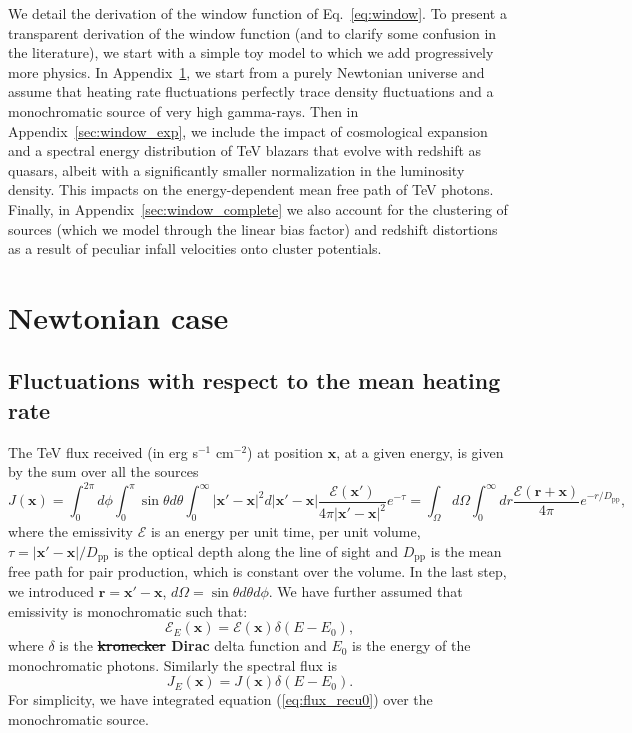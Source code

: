 \documentclass[numberedappendix]{emulateapj}
\newcommand\Ec[1]{{\color{magenta} \bf #1}} %
\begin{document}
\appendix
We detail the derivation of the window function of Eq.~\eqref{eq:window}. To present a transparent derivation of the window function (and to clarify some confusion in the literature), we start with a simple toy model to which we add progressively more physics. In Appendix~\ref{sec:windon_newt}, we start from a purely Newtonian universe and assume that heating rate fluctuations perfectly trace density fluctuations and a monochromatic source of very high gamma-rays. Then in Appendix~\ref{sec:window_exp}, we include the impact of cosmological expansion and a spectral energy distribution of TeV blazars that evolve with redshift as quasars, albeit with a significantly smaller normalization in the luminosity density. This impacts on the energy-dependent mean free path of TeV photons. Finally, in Appendix~\ref{sec:window_complete} we also account for the clustering of sources (which we model through the linear bias factor) and redshift distortions as a result of peculiar infall velocities onto cluster potentials.\\

\section {Newtonian case}\label{sec:windon_newt}
\subsection {Fluctuations with respect to the mean heating rate}

The TeV flux received (in erg s$^{-1}$ cm$^{-2}$) at position $\mathbf{x}$, at a given energy, is given by the sum over all the sources 
\begin{equation}
  \label{eq:flux_recu0}
  J(\mathbf{x})=
  \int_{0}^{2\pi}d\phi\int_{0}^{\pi}\sin\theta d\theta\int_0^{\infty}|\mathbf{x}'-\mathbf{x}|^2 d|\mathbf{x}'-\mathbf{x}|
  \frac{\mathcal{E}(\mathbf{x}') }{4\pi |\mathbf{x}'-\mathbf{x}|^2} e^{-\tau}
  =\int_{\Omega} d\Omega\int_0^{\infty} dr \frac{\mathcal{E}(\mathbf{r}+\mathbf{x}) }{4\pi } e^{- r/D_{\mathrm{pp}}},
\end{equation}
where the emissivity $\mathcal{E}$ is an energy per unit time, per unit volume, $\tau=|\mathbf{x}'-\mathbf{x}|/D_{\mathrm{pp}}$ is the optical depth along the line of sight and $D_{\mathrm{pp}}$ is the mean free path for pair production, which is constant over the volume. In the last step, we introduced $\mathbf{r}=\mathbf{x}'-\mathbf{x}$, $d\Omega=\sin\theta d\theta d\phi$. We have further assumed that emissivity is monochromatic such that:
\begin{equation}
\mathcal{E}_E(\mathbf{x}) = \mathcal{E}(\mathbf{x}) \delta(E-E_0),
\end{equation}
where $\delta$ is the \Ec{\sout{kronecker} Dirac} delta function and $E_0$ is the energy of the monochromatic photons. Similarly the spectral flux is 
\begin{equation}
J_E(\mathbf{x}) = J(\mathbf{x}) \delta(E-E_0).
\end{equation}
For simplicity, we have integrated equation (\ref{eq:flux_recu0}) over the monochromatic source.
\end{document}
